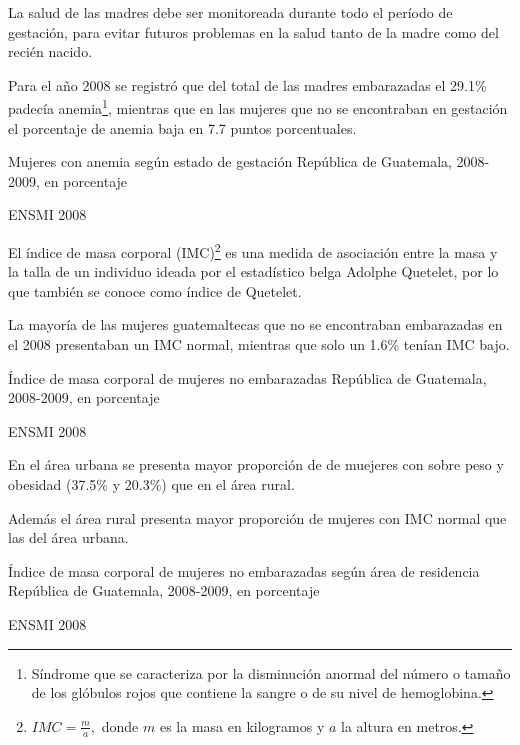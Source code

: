 
{%
	La salud de las madres debe ser monitoreada durante todo el período de gestación, para evitar futuros problemas en la salud tanto de la madre como del recién nacido. 
	
	Para el año 2008 se registró que del total de las madres embarazadas el 29.1\% padecía anemia\footnote{Síndrome que se caracteriza por la disminución anormal del número o tamaño de los glóbulos rojos que contiene la sangre o de su nivel de hemoglobina.}, mientras que en las mujeres que no se encontraban en gestación el porcentaje de anemia baja en 7.7 puntos porcentuales. 
 }%
{%
 Mujeres con anemia según estado de gestación} %
{%
 República de Guatemala, 2008-2009, en porcentaje} %
{%
 \begin{tikzpicture}[x=1pt,y=1pt]    \end{tikzpicture}}%
{%
ENSMI 2008 } %


%
{%
	El índice de masa corporal (IMC)\footnote{$IMC = \frac{m}{a},
		 $ donde $m$ es la masa en kilogramos y $a$ la altura en metros.} es una medida de asociación entre la masa y la talla de un individuo ideada por el estadístico belga Adolphe Quetelet, por lo que también se conoce como índice de Quetelet.
		
		La mayoría de las mujeres guatemaltecas que no se encontraban embarazadas en el 2008 presentaban un IMC normal, mientras que solo un 1.6\% tenían IMC bajo. 
}%
{%
	Índice de masa corporal de mujeres no embarazadas} %
{%
	República de Guatemala, 2008-2009, en porcentaje} %
{%
	\begin{tikzpicture}[x=1pt,y=1pt]    \end{tikzpicture}}%
{%
	ENSMI 2008} %



%
{%
	En el área urbana se presenta mayor proporción de de muejeres con sobre peso y obesidad (37.5\% y 20.3\%) que en el área rural. 
	
	Además el área rural presenta mayor proporción de mujeres con IMC normal que las del área urbana.  
	
	
}%
{%
	Índice de masa corporal de mujeres no embarazadas según área de residencia} %
{%
	República de Guatemala, 2008-2009, en porcentaje} %
{%
	\begin{tikzpicture}[x=1pt,y=1pt]    \end{tikzpicture}}%
{%
	ENSMI 2008} %


